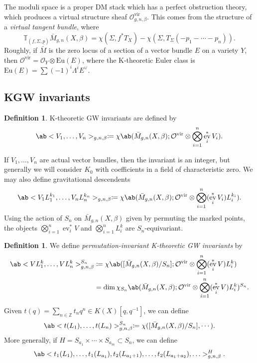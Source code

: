 \documentclass{amsart}
\theoremstyle{definition}
\newtheorem{defn}[thm]{Definition}
\theoremstyle{remark}
\theoremstyle{plain}
\theoremstyle{definition}
\theoremstyle{remark}
\newcommand{\Z}{\mathbb{Z}}
\newcommand{\mc}[1]{\mathcal{#1}}
\newcommand{\mr}[1]{\mathrm{#1}}
\newcommand{\ul}[1]{\underline{#1}}
\newcommand{\1}{\mathbf{1}}
\newcommand{\2}{\mathbf{2}}
\newcommand{\3}{\mathbf{3}}
\newcommand{\vir}{\mr{vir}}
\DeclareMathOperator{\ev}{ev}
\begin{document}
The moduli space is a proper DM stack which has a perfect obstruction theory, which produces a virtual structure sheaf \(\mc{O}^{\vir}_{g,n,\beta}\). This comes from the structure of a \textit{virtual tangent bundle}, where
\[ \mathbb{T}_{(f, \Sigma, \ul{p})} \bar{M}_{g,n}(X, \beta) = \chi(\Sigma, f^* T_X) - \chi(\Sigma, T_{\Sigma}(-p_1 - \cdots - p_n)). \]
Roughly, if \(\bar{M}\) is the zero locus of a section of a vector bundle \(E\) on a variety \(Y\), then \(\mc{O}^{\vir} = \mc{O}_Y \otimes \mr{Eu}(E)\), where the K-theoretic Euler class is \(\mr{Eu}(E) = \sum (-1)^i \Lambda^i E^{\vee}\).

\subsection{KGW invariants}%
\label{sub:KGW invariants}

\begin{defn}
    K-theoretic GW invariants are defined by
    \[ \ab<V_1, \ldots, V_n>_{g,n,\beta} \coloneqq \chi\ab(\bar{M}_{g,n}(X, \beta); \mc{O}^{\vir} \otimes \bigotimes_{i=1}^n \ev_i^* V_i). \]
\end{defn}

If \(V_1, \ldots, V_n\) are actual vector bundles, then the invariant is an integer, but generally we will consider \(K_0\) with coefficients in a field of characteristic zero. We may also define gravitational descendents
\[ \ab<V_1 L_1^{k_1}, \ldots, V_n L_n^{k_n}>_{g,n,\beta} \coloneqq \chi\ab(\bar{M}_{g,n}(X, \beta); \mc{O}^{\vir} \otimes \bigotimes_{i=1}^n ( \ev_i^* V_i )L_i^{k_i} ). \]
Using the action of \(S_n\) on \(\bar{M}_{g,n}(X, \beta)\) given by permuting the marked points, the objects \(\bigotimes_{i=1}^n \ev_i^* V\) and \(\bigotimes_{i=1}^n L_i^k\) are \(S_n\)-equivariant.

\begin{defn}
    We define \textit{permutation-invariant K-theoretic GW invariants} by
    \begin{align*}
        \ab<V L_1^k, \ldots, V L_n^k>_{g,n,\beta}^{S_n} &\coloneqq \chi\ab([ \bar{M}_{g,n}(X, \beta)/S_n ]; \mc{O}^{\vir} \otimes \bigotimes_{i=1}^n ( \ev_i^* V ) L_i^k) \\
        &= \dim \chi_{S_n} \ab(\bar{M}_{g,n}(X, \beta); \mc{O}^{\vir} \otimes \bigotimes_{i=1}^n ( \ev_i^* V ) L_i^k )^{S_n}.
    \end{align*}
\end{defn}

Given \(t(q) = \sum_{n \in \Z} t_n q^n \in K(X)[q,q^{-1}]\), we can define
\[ \ab< t(L_1), \ldots, t(L_n)>^{S_n}_{g,n,\beta} \coloneqq \chi ([\bar{M}_{g,n}(X,\beta)/S_n], \cdots). \]
More generally, if \(H = S_{a_1} \times \cdots \times S_{a_m} \subset S_n\), we can define
\[ \ab<t_1(L_1), \ldots, t_1(L_{a_1}), t_2(L_{a_1+1}), \ldots, t_2(L_{a_1+a_2}), \ldots>_{g,n,\beta}^H. \]
\end{document}
